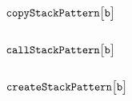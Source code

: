 \subsubsection{$\texttt{copy}\texttt{StackPattern}\big[\texttt{b}\big]$                                                         \lispDone{}}  \label{hub: stack patterns: copy}             
\subsubsection{$\texttt{call}\texttt{StackPattern}\big[\texttt{b}\big]$                                                         \lispDone{}}  \label{hub: stack patterns: call}             
\subsubsection{$\texttt{create}\texttt{StackPattern}\big[\texttt{b}\big]$                                                       \lispDone{}}  \label{hub: stack patterns: create}           
